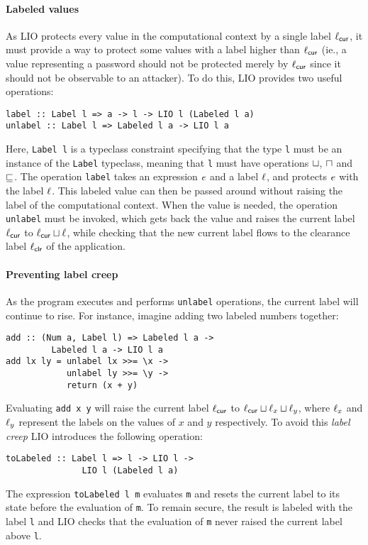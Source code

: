 \paragraph{Labeled values}
As LIO protects every value in the computational context by a single label $\ell_{\mathsf{cur}}$, it must provide a way to protect some values with a label higher than $\ell_{\mathsf{cur}}$ (ie., a value representing a password should not be protected merely by $\ell_{\mathsf{cur}}$ since it should not be observable to an attacker). To do this, LIO provides two useful operations:
\begin{verbatim}
label :: Label l => a -> l -> LIO l (Labeled l a)
unlabel :: Label l => Labeled l a -> LIO l a
\end{verbatim}
Here, \texttt{Label l} is a typeclass constraint specifying that the type \texttt{l} must be an instance of the \texttt{Label} typeclass, meaning that \texttt{l} must have operations $\sqcup$, $\sqcap$ and $\sqsubseteq$. The operation \texttt{label} takes an expression $e$ and a label $\ell$, and protects $e$ with the label $\ell$. This labeled value can then be passed around without raising the label of the computational context. When the value is needed, the operation \texttt{unlabel} must be invoked, which gets back the value and raises the current label $\ell_{\mathsf{cur}}$ to $\ell_{\mathsf{cur}} \sqcup \ell$, while checking that the new current label flows to the clearance label $\ell_{\mathsf{clr}}$ of the application.

\paragraph{Preventing label creep}
As the program executes and performs \texttt{unlabel} operations, the current label will continue to rise. For instance, imagine adding two labeled numbers together:
\begin{verbatim}
add :: (Num a, Label l) => Labeled l a ->
         Labeled l a -> LIO l a
add lx ly = unlabel lx >>= \x ->
            unlabel ly >>= \y ->
            return (x + y)
\end{verbatim}
Evaluating \texttt{add x y} will raise the current label $\ell_{\mathsf{cur}}$ to $\ell_{\mathsf{cur}} \sqcup \ell_x \sqcup \ell_y$, where $\ell_x$ and $\ell_y$ represent the labels on the values of $x$ and $y$ respectively. To avoid this \emph{label creep} LIO introduces the following operation:
\begin{verbatim}
toLabeled :: Label l => l -> LIO l ->
               LIO l (Labeled l a)
\end{verbatim}
The expression \texttt{toLabeled l m} evaluates \texttt{m} and resets the current label to its state before the evaluation of \texttt{m}. To remain secure, the result is labeled with the label \texttt{l} and LIO checks that the evaluation of \texttt{m} never raised the current label above \texttt{l}.